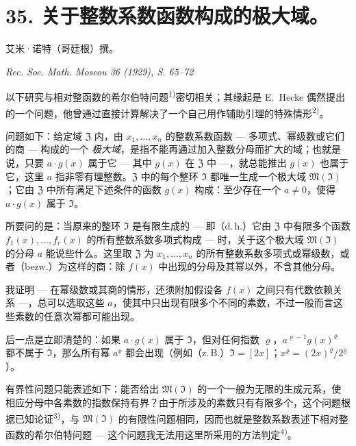 \documentclass[11pt]{article}
\begin{document}
\setcounter{footnote}{0}

\section*{35. 关于整数系数函数构成的极大域。}

\begin{center}
艾米·诺特（哥廷根）撰。\par
\emph{Rec. Soc. Math. Moscou 36 (1929), S. 65--72}
\end{center}




以下研究与相对整函数的希尔伯特问题\textsuperscript{1)}密切相关；其缘起是 E.\ Hecke 偶然提出的一个问题，他曾通过直接计算解决了一个自己用作辅助引理的特殊情形\textsuperscript{2)}。

问题如下：给定域 $\mathfrak{Z}$ 内，由 $x_1,\ldots,x_n$ 的整数系数函数 --- 多项式、幂级数或它们的商 --- 构成的一个 \textit{极大域}，是指不能再通过加入整数分母而扩大的域；也就是说，只要 $a \cdot g(x)$ 属于它 --- 其中 $g(x)$ 在 $\mathfrak{Z}$ 中 ---，就总能推出 $g(x)$ 也属于它，这里 $a$ 指非零有理整数。$\mathfrak{Z}$ 中的每个整环 $\mathfrak{I}$ 都唯一生成一个极大域 $\mathfrak{M}(\mathfrak{I})$；它由 $\mathfrak{Z}$ 中所有满足下述条件的函数 $g(x)$ 构成：至少存在一个 $a \neq 0$，使得 $a \cdot g(x)$ 属于 $\mathfrak{I}$。

所要问的是：当原来的整环 $\mathfrak{I}$ 是有限生成的 --- 即（d.\,h.）它由 $\mathfrak{Z}$ 中有限多个函数 $f_1(x),\ldots,f_r(x)$ 的所有整数系数多项式构成 --- 时，关于这个极大域 $\mathfrak{M}(\mathfrak{I})$ 的分母 $a$ 能说些什么。这里取 $\mathfrak{Z}$ 为 $x_1,\ldots,x_n$ 的所有整数系数多项式或幂级数，或者（bezw.）为这样的商：除 $f(x)$ 中出现的分母及其幂以外，不含其他分母。

我证明 --- 在幂级数或其商的情形，还须附加假设各 $f(x)$ 之间只有代数依赖关系 ---，总可以选取这些 $a$，使其中只出现有限多个不同的素数，不过一般而言这些素数的任意次幂都可能出现。

后一点是立即清楚的：如果 $a\cdot g(x)$ 属于 $\mathfrak{I}$，但对任何指数 $\varrho$，$a^{\varrho-1}g(x)^{\varrho}$ 都不属于 $\mathfrak{I}$，那么所有幂 $a^{\varrho}$ 都会出现（例如（z.\,B.）$\mathfrak{I}=[2x]$；$x^{\varrho}=(2x)^{\varrho}/2^{\varrho}$）。

有界性问题只能表述如下：能否给出 $\mathfrak{M}(\mathfrak{I})$ 的一个一般为无限的生成元系，使相应分母中各素数的指数保持有界？由于所涉及的素数只有有限多个，这个问题根据已知论证\textsuperscript{3)}，与 $\mathfrak{M}(\mathfrak{I})$ 的有限性问题相同，因而也就是整数系数表述下相对整函数的希尔伯特问题 --- 这个问题我无法用这里所采用的方法判定\textsuperscript{4)}。
\end{document}
